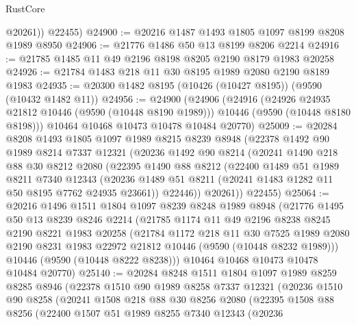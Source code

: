 \begin{lexlean}{RustCore}
\begin{coremodule}
          @20261))
      @22455)
@24900 := @20216 @1487 @1493 @1805 @1097 @8199 @8208 @1989 @8950
@24906 := @21776 @1486 @50 @13 @8199 @8206 @2214
@24916 := @21785 @1485 @11 @49 @2196 @8198 @8205 @2190 @8179 @1983 @20258
@24926 := @21784 @1483 @218 @11 @30 @8195 @1989 @2080 @2190 @8189 @1983
@24935 := @20300 @1482 @8195 (@10426 (@10427 @8195)) (@9590 (@10432 @1482 @11))
@24956 := @24900
    (@24906
      (@24916
        (@24926 @24935 @21812 @10446 (@9590 (@10448 @8190 @1989)))
        @10446
        (@9590 (@10448 @8180 @8198)))
      @10464
      @10468
      @10473
      @10478
      @10484
      @20770)
@25009 := @20284
    @8208
    @1493
    @1805
    @1097
    @1989
    @8215
    @8239
    @8948
    (@22378
      @1492
      @90
      @1989
      @8214
      @7337
      @12321
      (@20236
        @1492
        @90
        @8214
        (@20241
          @1490
          @218
          @88
          @30
          @8212
          @2080
          (@22395
            @1490
            @88
            @8212
            (@22400
              @1489
              @51
              @1989
              @8211
              @7340
              @12343
              (@20236 @1489 @51 @8211 (@20241 @1483 @1282 @11 @50 @8195 @7762 @24935 @23661))
              @22446))
          @20261))
      @22455)
@25064 := @20216
    @1496
    @1511
    @1804
    @1097
    @8239
    @8248
    @1989
    @8948
    (@21776
      @1495
      @50
      @13
      @8239
      @8246
      @2214
      (@21785
        @1174
        @11
        @49
        @2196
        @8238
        @8245
        @2190
        @8221
        @1983
        @20258
        (@21784
          @1172
          @218
          @11
          @30
          @7525
          @1989
          @2080
          @2190
          @8231
          @1983
          @22972
          @21812
          @10446
          (@9590 (@10448 @8232 @1989)))
        @10446
        (@9590 (@10448 @8222 @8238)))
      @10464
      @10468
      @10473
      @10478
      @10484
      @20770)
@25140 := @20284
    @8248
    @1511
    @1804
    @1097
    @1989
    @8259
    @8285
    @8946
    (@22378
      @1510
      @90
      @1989
      @8258
      @7337
      @12321
      (@20236
        @1510
        @90
        @8258
        (@20241
          @1508
          @218
          @88
          @30
          @8256
          @2080
          (@22395
            @1508
            @88
            @8256
            (@22400
              @1507
              @51
              @1989
              @8255
              @7340
              @12343
              (@20236

\end{coremodule}
\end{lexlean}
